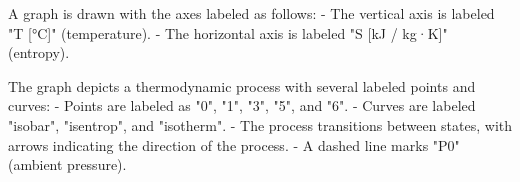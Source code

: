A graph is drawn with the axes labeled as follows:  
- The vertical axis is labeled "T [°C]" (temperature).  
- The horizontal axis is labeled "S [kJ / kg·K]" (entropy).  

The graph depicts a thermodynamic process with several labeled points and curves:  
- Points are labeled as "0", "1", "3", "5", and "6".  
- Curves are labeled "isobar", "isentrop", and "isotherm".  
- The process transitions between states, with arrows indicating the direction of the process.  
- A dashed line marks "P0" (ambient pressure).